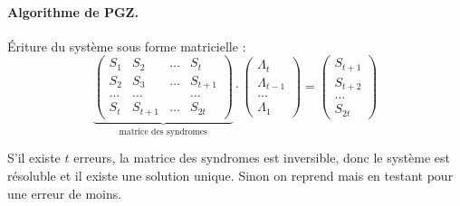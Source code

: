 	\paragraph{Algorithme de PGZ.} Ériture du système sous forme matricielle :
	$$\underset{\text{matrice des syndromes}}{\underbrace{\begin{pmatrix}
		S_1    & S_2       & \ldots & S_t \\
		S_2    & S_3       & \ldots & S_{t + 1} \\
		\hdots & \hdots    &        & \hdots \\
		S_t    & S_{t + 1} & \ldots & S_{2t}
		\end{pmatrix}}} \cdot
		\begin{pmatrix} \Lambda_t \\ \Lambda_{t - 1} \\ \hdots \\ \Lambda_1 \end{pmatrix}
		=
		\begin{pmatrix} S_{t + 1} \\ S_{t + 2} \\ \hdots \\ S_{2t} \end{pmatrix}$$

	S'il existe $t$ erreurs, la matrice des syndromes est inversible, donc le système est résoluble et il existe une solution unique.
	Sinon on reprend mais en testant pour une erreur de moins.
